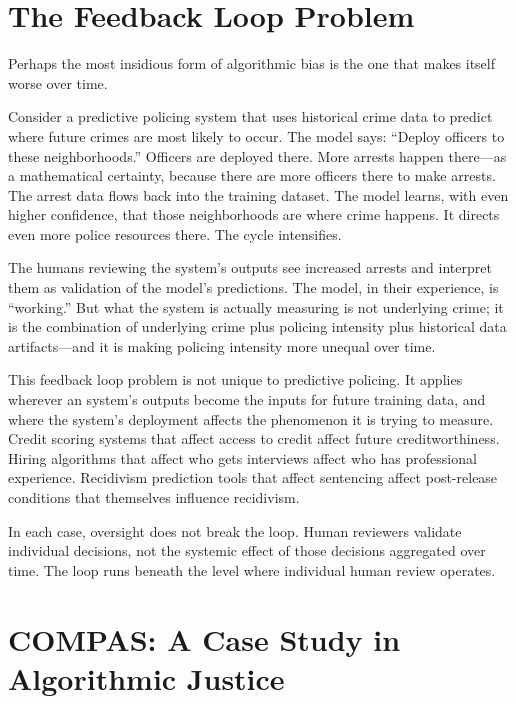 \section{The Feedback Loop Problem}
\label{sec:ch14-feedback-loops}

Perhaps the most insidious form of algorithmic bias is the one that makes itself worse over time.

Consider a predictive policing system that uses historical crime data to predict where future crimes are most likely to occur. The model says: ``Deploy officers to these neighborhoods.'' Officers are deployed there. More arrests happen there---as a mathematical certainty, because there are more officers there to make arrests. The arrest data flows back into the training dataset. The model learns, with even higher confidence, that those neighborhoods are where crime happens. It directs even more police resources there. The cycle intensifies.

The humans reviewing the system's outputs see increased arrests and interpret them as validation of the model's predictions. The model, in their experience, is ``working.'' But what the system is actually measuring is not underlying crime; it is the combination of underlying crime plus policing intensity plus historical data artifacts---and it is making policing intensity more unequal over time.

This feedback loop problem is not unique to predictive policing. It applies wherever an \ai system's outputs become the inputs for future training data, and where the system's deployment affects the phenomenon it is trying to measure. Credit scoring systems that affect access to credit affect future creditworthiness. Hiring algorithms that affect who gets interviews affect who has professional experience. Recidivism prediction tools that affect sentencing affect post-release conditions that themselves influence recidivism.

In each case, \hitl oversight does not break the loop. Human reviewers validate individual decisions, not the systemic effect of those decisions aggregated over time. The loop runs beneath the level where individual human review operates.

\section{COMPAS: A Case Study in Algorithmic Justice}
\label{sec:ch14-compas}

